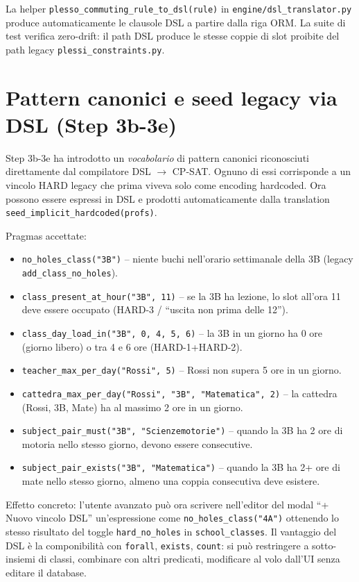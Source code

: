 La helper \texttt{plesso\_commuting\_rule\_to\_dsl(rule)} in
\texttt{engine/dsl\_translator.py} produce automaticamente le
clausole DSL a partire dalla riga ORM. La suite di test
verifica zero-drift: il path DSL produce le stesse coppie di
slot proibite del path legacy
\texttt{plessi\_constraints.py}.

\section{Pattern canonici e seed legacy via DSL (Step 3b-3e)}

Step 3b-3e ha introdotto un \emph{vocabolario} di pattern
canonici riconosciuti direttamente dal compilatore DSL $\to$
CP-SAT. Ognuno di essi corrisponde a un vincolo HARD legacy che
prima viveva solo come encoding hardcoded. Ora possono essere
espressi in DSL e prodotti automaticamente dalla translation
\texttt{seed\_implicit\_hardcoded(profs)}.

Pragmas accettate:
\begin{itemize}
\item \texttt{no\_holes\_class("3B")} -- niente buchi
  nell'orario settimanale della 3B (legacy
  \texttt{add\_class\_no\_holes}).
\item \texttt{class\_present\_at\_hour("3B", 11)} -- se la 3B
  ha lezione, lo slot all'ora 11 deve essere occupato (HARD-3
  / ``uscita non prima delle 12'').
\item \texttt{class\_day\_load\_in("3B", 0, 4, 5, 6)} -- la
  3B in un giorno ha 0 ore (giorno libero) o tra 4 e 6 ore
  (HARD-1+HARD-2).
\item \texttt{teacher\_max\_per\_day("Rossi", 5)} -- Rossi non
  supera 5 ore in un giorno.
\item \texttt{cattedra\_max\_per\_day("Rossi", "3B",
  "Matematica", 2)} -- la cattedra (Rossi, 3B, Mate) ha al
  massimo 2 ore in un giorno.
\item \texttt{subject\_pair\_must("3B", "Scienzemotorie")} --
  quando la 3B ha 2 ore di motoria nello stesso giorno,
  devono essere consecutive.
\item \texttt{subject\_pair\_exists("3B", "Matematica")} --
  quando la 3B ha 2+ ore di mate nello stesso giorno, almeno
  una coppia consecutiva deve esistere.
\end{itemize}

Effetto concreto: l'utente avanzato pu\`o ora scrivere
nell'editor del modal ``+ Nuovo vincolo DSL'' un'espressione
come \texttt{no\_holes\_class("4A")} ottenendo lo stesso
risultato del toggle \texttt{hard\_no\_holes} in
\texttt{school\_classes}. Il vantaggio del DSL \`e la
componibilit\`a con \texttt{forall}, \texttt{exists},
\texttt{count}: si pu\`o restringere a sotto-insiemi di classi,
combinare con altri predicati, modificare al volo dall'UI
senza editare il database.

